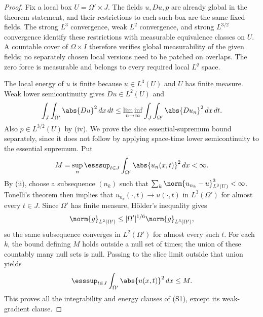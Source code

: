 \documentclass[11pt,reqno]{amsart}
\begin{document}
\begin{proof}
Fix a local box $U=\Omega'\times J$. The fields $u,Du,p$ are already
global in the theorem statement, and their restrictions to each such box are
the same fixed fields. The strong $L^3$ convergence, weak $L^2$ convergence,
and strong $L^{3/2}$ convergence identify these restrictions with measurable
equivalence classes on $U$. A countable cover of $\Omega\times I$ therefore
verifies global measurability of the given fields; no separately chosen local
versions need to be patched on overlaps. The zero force is measurable and
belongs to every required local $L^q$ space.

The local energy of $u$ is finite because $u\in L^3(U)$ and $U$ has finite
measure. Weak lower semicontinuity gives $Du\in L^2(U)$ and
\[
 \int_J\int_{\Omega'}\abs{Du}^2\,dx\,dt
 \leq\liminf_{n\to\infty}
       \int_J\int_{\Omega'}\abs{Du_n}^2\,dx\,dt.
\]
Also $p\in L^{3/2}(U)$ by (iv). We prove the slice essential-supremum bound
separately, since it does not follow by applying space-time lower
semicontinuity to the essential supremum. Put
\[
 M=\sup_n\esssup_{t\in J}\int_{\Omega'}\abs{u_n(x,t)}^2\,dx<\infty.
\]
By (ii), choose a subsequence $(n_k)$ such that
$\sum_k\norm{u_{n_k}-u}_{L^3(U)}^3<\infty$. Tonelli's theorem then implies
that $u_{n_k}(\cdot,t)\to u(\cdot,t)$ in $L^3(\Omega')$ for almost every
$t\in J$. Since $\Omega'$ has finite measure, Hölder's inequality gives
\[
 \norm{g}_{L^2(\Omega')}
       \leq |\Omega'|^{1/6}\norm{g}_{L^3(\Omega')},
\]
so the same subsequence converges in $L^2(\Omega')$ for almost every such
$t$. For each $k$, the bound defining $M$ holds outside a null set of times;
the union of these countably many null sets is null. Passing to the slice
limit outside that union yields
\[
 \esssup_{t\in J}\int_{\Omega'}\abs{u(x,t)}^2\,dx\leq M.
\]
This proves all the integrability and energy clauses of (S1), except its
weak-gradient clause.


\end{proof}
\end{document}
